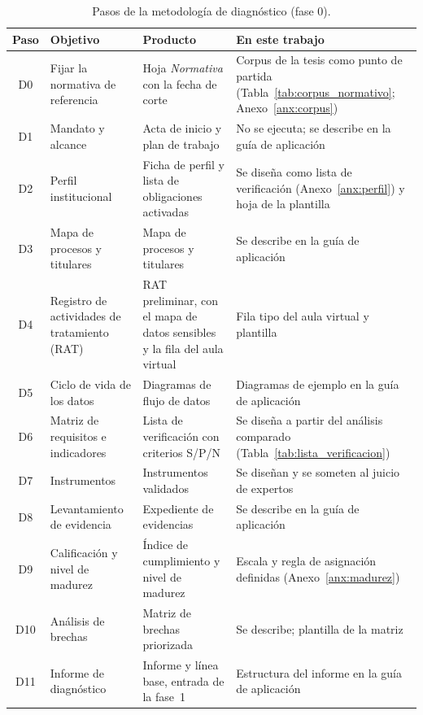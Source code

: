 \begin{table}[htbp]
  \centering
  \caption{Pasos de la metodología de diagnóstico (fase 0).}
  \label{tab:pasos_diagnostico}
  \scriptsize
  \renewcommand{\arraystretch}{1.12}
  \begin{tabularx}{\textwidth}{|c|>{\raggedright\arraybackslash}p{3.0cm}|>{\raggedright\arraybackslash}p{3.4cm}|L|}
    \hline
    \textbf{Paso} & \textbf{Objetivo} & \textbf{Producto} & \textbf{En este trabajo} \\
    \hline
    D0 & Fijar la normativa de referencia & Hoja \textit{Normativa} con la fecha de corte & Corpus de la tesis como punto de partida (Tabla~\ref{tab:corpus_normativo}; Anexo~\ref{anx:corpus}) \\ \hline
    D1 & Mandato y alcance & Acta de inicio y plan de trabajo & No se ejecuta; se describe en la guía de aplicación \\ \hline
    D2 & Perfil institucional & Ficha de perfil y lista de obligaciones activadas & Se diseña como lista de verificación (Anexo~\ref{anx:perfil}) y hoja de la plantilla \\ \hline
    D3 & Mapa de procesos y titulares & Mapa de procesos y titulares & Se describe en la guía de aplicación \\ \hline
    D4 & Registro de actividades de tratamiento (RAT) & RAT preliminar, con el mapa de datos sensibles y la fila del aula virtual & Fila tipo del aula virtual y plantilla \\ \hline
    D5 & Ciclo de vida de los datos & Diagramas de flujo de datos & Diagramas de ejemplo en la guía de aplicación \\ \hline
    D6 & Matriz de requisitos e indicadores & Lista de verificación con criterios S/P/N & Se diseña a partir del análisis comparado (Tabla~\ref{tab:lista_verificacion}) \\ \hline
    D7 & Instrumentos & Instrumentos validados & Se diseñan y se someten al juicio de expertos \\ \hline
    D8 & Levantamiento de evidencia & Expediente de evidencias & Se describe en la guía de aplicación \\ \hline
    D9 & Calificación y nivel de madurez & Índice de cumplimiento y nivel de madurez & Escala y regla de asignación definidas (Anexo~\ref{anx:madurez}) \\ \hline
    D10 & Análisis de brechas & Matriz de brechas priorizada & Se describe; plantilla de la matriz \\ \hline
    D11 & Informe de diagnóstico & Informe y línea base, entrada de la fase~1 & Estructura del informe en la guía de aplicación \\ \hline
  \end{tabularx}
  \raggedright
\end{table}

